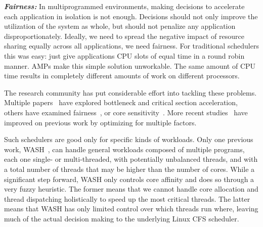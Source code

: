 \textbf{\textit{Fairness:}} In multiprogrammed environments, making decisions to accelerate each application in isolation is not enough. Decisions should not only improve the utilization of the system as whole, but should not penalize any application disproportionately. Ideally, we need to spread the negative impact of resource sharing equally across all applications, we need fairness. For traditional schedulers this was easy: just give applications CPU slots of equal time in a round robin manner. AMPs make this simple solution unworkable. The same amount of CPU time results in completely different amounts of work on different processors.


The research community has put considerable effort into tackling these problems. Multiple papers~\cite{han2018multicore,chronaki2017task,joao2012bottleneck,suleman2009accelerating,du2013criticality} have explored bottleneck and critical section acceleration, others have examined fairness~\cite{zahedi2018amdahl,wang2016rebudget,van2012scheduling,li2009efficient,li2007efficient}, or core sensitivity~\cite{cao2012yin,kumar2004single,becchi2006dynamic}. More recent studies~\cite{kim2018exploring,kim2016fairness,saez2012leveraging,van2013fairness,joao2013utility} have improved on previous work by optimizing for multiple factors.

Such schedulers are good only for specific kinds of workloads. Only one previous work, WASH~\cite{jibaja2016portable}, can handle general workloads composed of multiple programs, each one single- or multi-threaded, with potentially unbalanced threads, and with a total number of threads that may be higher than the number of cores. While a significant step forward, WASH only controls core affinity and does so through a very fuzzy heuristic. The former means that we cannot handle core allocation and thread dispatching holistically to speed up the most critical threads. The latter means that WASH has only limited control over which threads run where, leaving much of the actual decision making to the underlying Linux CFS scheduler.

